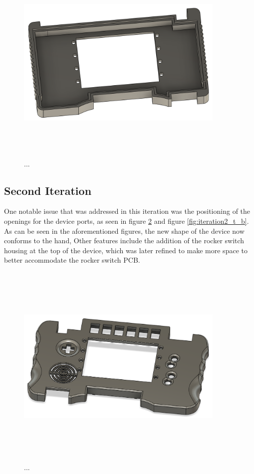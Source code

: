\begin{figure} [h]
    \centering
    \includegraphics[width=10cm,height=10cm,keepaspectratio]{Figures/iteration1_top_back.png}
    \caption{...}
    \label{fig:iteration1_t_b}
\end{figure}

\subsection{Second Iteration}

One notable issue that was addressed in this iteration was the positioning of the openings for the device ports, as seen in figure \ref{fig:iteration2_t_f} and figure \ref{fig:iteration2_t_b}.
As can be seen in the aforementioned figures, the new shape of the device now conforms to the hand,
Other features include the addition of the rocker switch housing at the top of the device, which was later refined to make more space to better accommodate the rocker switch PCB.

\begin{figure} [h]
    \centering
    \includegraphics[width=10cm,height=10cm,keepaspectratio]{Figures/iteration2_top_front.png}
    \caption{...}
    \label{fig:iteration2_t_f}
\end{figure}

